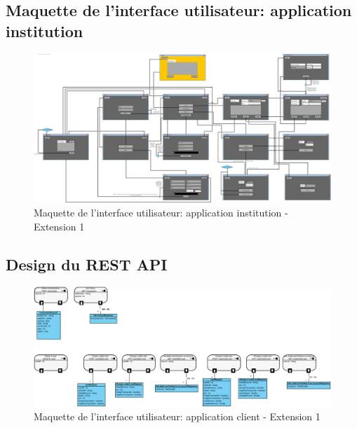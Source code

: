 \documentclass[]{report}
\begin{document}



\subsection{Maquette de l'interface utilisateur: application institution}

\begin{figure}[h]
	\centering\includegraphics[width=\linewidth]{img/ui-institution-Extension-1.pdf}
	\caption{Maquette de l'interface utilisateur: application institution - Extension 1}
\end{figure}



\subsection{Design du REST API}

\begin{figure}[h]
	\centering\includegraphics[width=\linewidth]{img/rest-api-Extension-1.pdf}
	\caption{Maquette de l'interface utilisateur: application client - Extension 1}
\end{figure}


\end{document}
